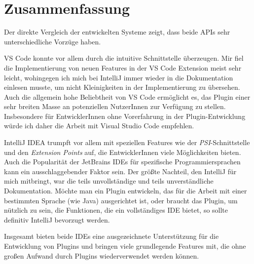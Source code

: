 \chapter{Zusammenfassung}
\label{cha:Conclusion}

Der direkte Vergleich der entwickelten Systeme zeigt,
dass beide APIs sehr unterschiedliche Vorzüge haben.

VS Code konnte vor allem durch die intuitive
Schnittstelle überzeugen. Mir fiel die Implementierung
von neuen Features in der VS Code Extension meist sehr
leicht, wohingegen ich mich bei IntelliJ immer wieder
in die Dokumentation einlesen musste, um nicht
Kleinigkeiten in der Implementierung zu übersehen.
Auch die allgemein hohe Beliebtheit von VS Code
ermöglicht es, das Plugin einer sehr breiten Masse 
an potenziellen NutzerInnen zur Verfügung zu stellen.
Insbesondere für EntwicklerInnen ohne Vorerfahrung
in der Plugin-Entwicklung würde ich daher die Arbeit mit
Visual Studio Code empfehlen.

IntelliJ IDEA trumpft vor allem mit speziellen Features
wie der \emph{PSI}-Schnittstelle und den \emph{Extension Points} auf,
die EntwicklerInnen viele Möglichkeiten bieten.
Auch die Popularität der JetBrains IDEs für spezifische 
Programmiersprachen kann ein ausschlaggebender Faktor
sein. Der größte Nachteil, den IntelliJ für mich mitbringt,
war die teils unvollständige und teils unverständliche
Dokumentation. Möchte man ein Plugin entwickeln, das 
für die Arbeit mit einer bestimmten Sprache (wie Java)
ausgerichtet ist, oder braucht das Plugin, um nützlich zu
sein, die Funktionen, die ein vollständiges IDE bietet, so
sollte definitiv IntelliJ bevorzugt werden.

Insgesamt bieten beide IDEs eine ausgezeichnete 
Unterstützung für die Entwicklung von Plugins und
bringen viele grundlegende Features mit, die
ohne großen Aufwand durch Plugins wiederverwendet
werden können.
